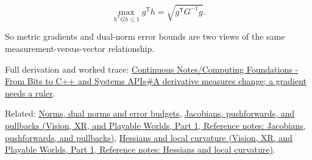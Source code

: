 \[
\max_{h^{\mathsf T}Gh\le1} g^{\mathsf T}h
=
\sqrt{g^{\mathsf T}G^{-1}g}.
\]

So metric gradients and dual-norm error bounds are two views of the same measurement-versus-vector relationship.

Full derivation and worked trace: \hyperref[01-foundations-i-ch018-a-derivative-measures-change-a-gradient-needs-a-ruler]{Continuous Notes/Computing Foundations - From Bits to C++ and Systems APIs\#A derivative measures change; a gradient needs a ruler}.

Related: \hyperref[appendix-d6d9dbbe3c14]{Norms, dual norms and error budgets}, \href{../07-Vision-XR-and-Playable-Worlds-P01/main.pdf\#nameddest=appendix-d8a7ddb675eb}{Jacobians, pushforwards, and pullbacks (Vision, XR, and Playable Worlds, Part 1, Reference notes: Jacobians, pushforwards, and pullbacks)}, \href{../07-Vision-XR-and-Playable-Worlds-P01/main.pdf\#nameddest=appendix-6ac071f8b50c}{Hessians and local curvature (Vision, XR, and Playable Worlds, Part 1, Reference notes: Hessians and local curvature)}.
